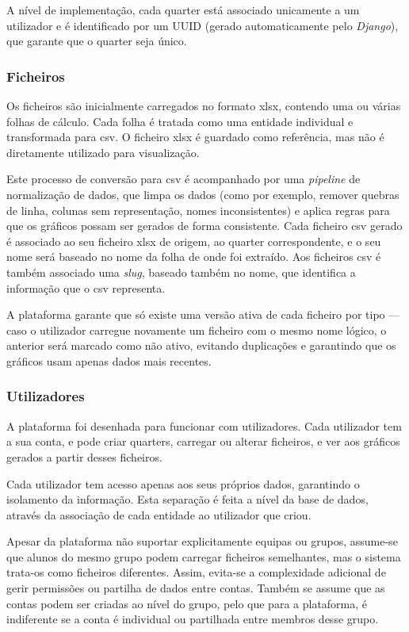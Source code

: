 A nível de implementação, cada quarter está associado unicamente a um utilizador e é identificado por um UUID (gerado automaticamente pelo \textit{Django}), que garante que o quarter seja único.

\subsubsection{Ficheiros}

Os ficheiros são inicialmente carregados no formato \gls{xlsx}, contendo uma ou várias folhas de cálculo. Cada folha é tratada como uma entidade individual e transformada para \gls{csv}. O ficheiro \gls{xlsx} é guardado como referência, mas não é diretamente utilizado para visualização.

Este processo de conversão para \gls{csv} é acompanhado por uma \textit{pipeline} de normalização de dados, que limpa os dados (como por exemplo, remover quebras de linha, colunas sem representação, nomes inconsistentes) e aplica regras para que os gráficos possam ser gerados de forma consistente. Cada ficheiro \gls{csv} gerado é associado ao seu ficheiro \gls{xlsx} de origem, ao quarter correspondente, e o seu nome será baseado no nome da folha de onde foi extraído. Aos ficheiros \gls{csv} é também associado uma \textit{slug}, baseado também no nome, que identifica a informação que o \gls{csv} representa.

A plataforma garante que só existe uma versão ativa de cada ficheiro por tipo — caso o utilizador carregue novamente um ficheiro com o mesmo nome lógico, o anterior será marcado como não ativo, evitando duplicações e garantindo que os gráficos usam apenas dados mais recentes.

\subsubsection{Utilizadores}

A plataforma foi desenhada para funcionar com utilizadores. Cada utilizador tem a sua conta, e pode criar quarters, carregar ou alterar ficheiros, e ver aos gráficos gerados a partir desses ficheiros.

Cada utilizador tem acesso apenas aos seus próprios dados, garantindo o isolamento da informação. Esta separação é feita a nível da base de dados, através da associação de cada entidade ao utilizador que criou.

Apesar da plataforma não suportar explicitamente equipas ou grupos, assume-se que alunos do mesmo grupo podem carregar ficheiros semelhantes, mas o sistema trata-os como ficheiros diferentes. Assim, evita-se a complexidade adicional de gerir permissões ou partilha de dados entre contas. Também se assume que as contas podem ser criadas ao nível do grupo, pelo que para a plataforma, é indiferente se a conta é individual ou partilhada entre membros desse grupo.

